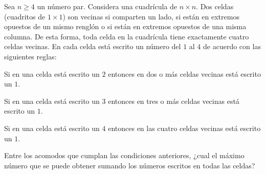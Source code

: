 Sea $n \geq 4$ un número par. Considera una cuadrícula de $n \times n$. Dos celdas (cuadritos
de $1 \times 1$) son vecinas si comparten un lado, si están en extremos opuestos de un mismo
renglón o si están en extremos opuestos de una misma columna. De esta forma, toda celda
en la cuadrícula tiene exactamente cuatro celdas vecinas.
En cada celda está escrito un número del $1$ al $4$ de acuerdo con las siguientes reglas:

Si en una celda está escrito un $2$ entonces en dos o más celdas vecinas está escrito
un $1$.

Si en una celda está escrito un $3$ entonces en tres o más celdas vecinas está escrito
un $1$.

Si en una celda está escrito un $4$ entonces en las cuatro celdas vecinas está escrito
un $1$.

Entre los acomodos que cumplan las condiciones anteriores, ¿cual el máximo número que
se puede obtener sumando los números escritos en todas las celdas?